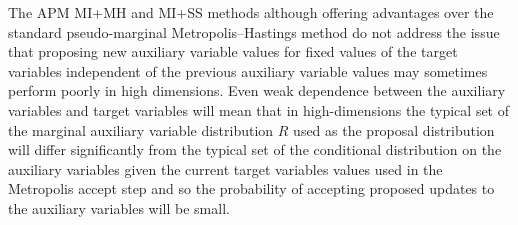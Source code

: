 The \ac{APM} \ac{MI}+\ac{MH} and \ac{MI}+\ac{SS} methods although offering advantages over the standard pseudo-marginal Metropolis--Hastings method do not address the issue that proposing new auxiliary variable values for fixed values of the target variables independent of the previous auxiliary variable values may sometimes perform poorly in high dimensions. Even weak dependence between the auxiliary variables and target variables will mean that in high-dimensions the typical set of the  marginal auxiliary variable distribution $R$ used as the proposal distribution will differ significantly from the typical set of the conditional distribution on the auxiliary variables given the current target variables values used in the Metropolis accept step and so the probability of accepting proposed updates to the auxiliary variables will be small. %


